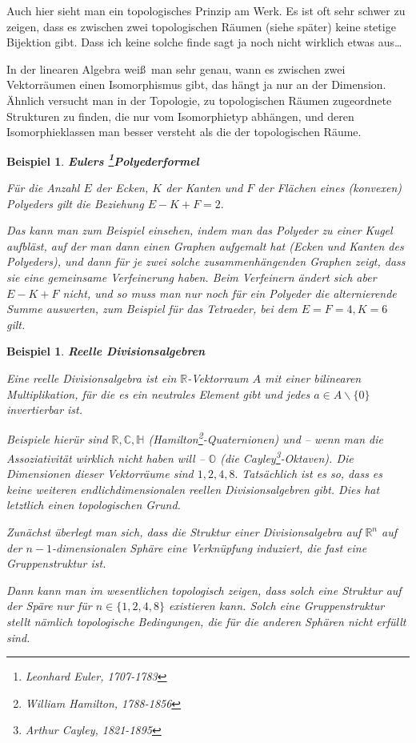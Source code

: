 \documentclass[12pt]{book}   %
\newtheorem{bsp}[alles]{Beispiel}
\begin{document}
Auch hier sieht man ein topologisches Prinzip am Werk. Es ist oft sehr schwer
zu zeigen, dass es zwischen zwei topologischen Räumen (siehe später) keine
stetige Bijektion gibt. Dass ich keine solche finde sagt ja noch nicht wirklich
etwas aus\dots

In der linearen Algebra wei\ss\  man sehr genau, wann es 
zwischen zwei Vektorräumen einen Isomorphismus gibt, das hängt ja nur an 
der Dimension. \"Ahnlich versucht man in der Topologie, zu topologischen 
Räumen zugeordnete Strukturen zu finden, die nur vom Isomorphietyp 
abhängen, und deren Isomorphieklassen man besser versteht als die der 
topologischen Räume.

\begin{bsp} {\bf Eulers \footnote{Leonhard Euler, 1707-1783}Polyederformel}

{\rm Für die Anzahl $E$ der Ecken, $K$ der Kanten und $F$ der Flächen eines
(konvexen) Polyeders gilt die Beziehung $E-K+F=2.$

Das kann man zum Beispiel einsehen, indem man das Polyeder zu einer Kugel 
aufbläst, auf der man dann einen Graphen aufgemalt hat (Ecken und Kanten des 
Polyeders), und dann für je zwei solche zusammenhängenden Graphen zeigt, 
dass sie eine gemeinsame Verfeinerung haben. Beim Verfeinern ändert sich
aber $E-K+F$ nicht, und so muss man nur noch für ein Polyeder die 
alternierende Summe auswerten, zum Beispiel für das Tetraeder, bei dem 
$E=F=4, K=6$ gilt.
}
\end{bsp}

\begin{bsp} {\bf Reelle Divisionsalgebren}

{\rm Eine reelle Divisionsalgebra ist ein $\mathbb R$-Vektorraum $A$ mit einer
bilinearen Multiplikation, für die es ein neutrales Element gibt und jedes
$a\in A\smallsetminus\{0\}$ invertierbar ist. 

Beispiele hierür sind $\mathbb R,\mathbb C, \mathbb H$ 
(Hamilton\footnote{William Hamilton, 1788-1856}-Quaternionen) und -- wenn man 
die Assoziativität wirklich nicht haben will -- $\mathbb O$ (die 
Cayley\footnote{Arthur Cayley, 1821-1895}-Oktaven). Die Dimensionen dieser 
Vektorräume sind $1,2,4,8.$ Tatsächlich ist es so, dass es keine weiteren
endlichdimensionalen reellen Divisionsalgebren gibt. Dies
hat letztlich einen topologischen Grund. 

Zunächst überlegt man sich, dass die Struktur einer Divisionsalgebra auf 
$\mathbb R^n$ auf der $n-1$-dimensionalen Sphäre eine Verknüpfung
induziert, die fast eine Gruppenstruktur ist.

Dann kann man im wesentlichen topologisch zeigen, dass solch eine Struktur
auf der Späre nur für
$n\in\{1,2,4,8\}$ existieren kann. Solch eine Gruppenstruktur stellt nämlich 
topologische Bedingungen, die für die anderen Sphären nicht erfüllt sind.
}\end{bsp}
\end{document}
